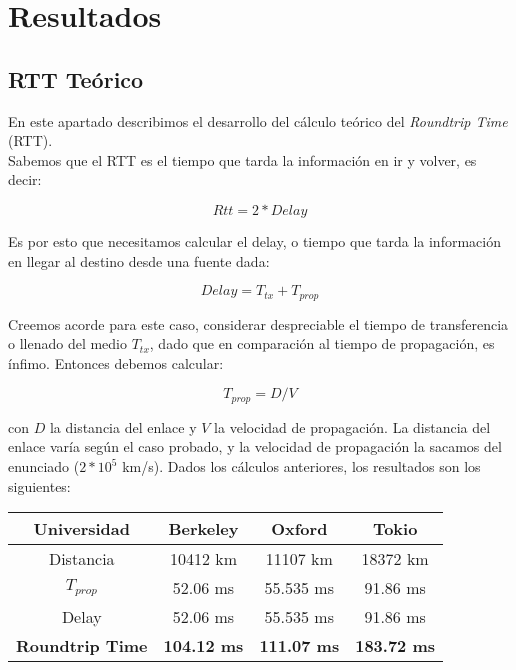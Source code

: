 \section{Resultados}

\subsection{RTT Teórico}

En este apartado describimos el desarrollo del cálculo teórico del \textit{Roundtrip Time} (RTT).
\\
Sabemos que el RTT es el tiempo que tarda la información en ir y volver, es decir:

\begin{equation}
	Rtt = 2 * Delay
\end{equation}

Es por esto que necesitamos calcular el delay, o tiempo que tarda la información en llegar al destino desde una fuente dada:

\begin{equation}
	Delay = T_{tx} + T_{prop}
\end{equation}

Creemos acorde para este caso, considerar despreciable el tiempo de transferencia o llenado del medio $T_{tx}$, dado que en comparación al tiempo de propagación, es ínfimo. Entonces debemos calcular:

\begin{equation}
	T_{prop} = D/V
\end{equation}

con $D$ la distancia del enlace y $V$ la velocidad de propagación. La distancia del enlace varía según el caso probado, y la velocidad de propagación la sacamos del enunciado ($2*10^5$ km/s). Dados los cálculos anteriores, los resultados son los siguientes:\\

\begin{center}
\begin{tabular}{| c | c | c | c |} \hline
	Universidad		&	\textbf{Berkeley}		&	\textbf{Oxford}		&	\textbf{Tokio}		\\ \hline
	Distancia		&	10412 km		&	11107 km		&	18372 km		\\ \hline
	$T_{prop}$		&	52.06 ms	&	55.535 ms	&	91.86 ms	\\ \hline
	Delay			&	52.06 ms	&	55.535 ms	&	91.86 ms	\\ \hline
	\textbf{Roundtrip Time}	&	\textbf{104.12 ms}	&	\textbf{111.07 ms}	&	\textbf{183.72 ms}	\\ \hline
\end{tabular}
\end{center}
